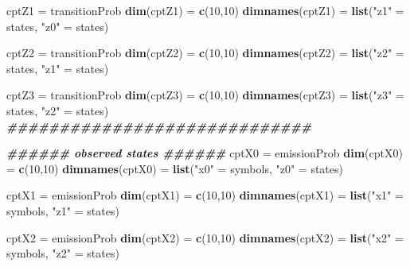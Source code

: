 \documentclass[
]{article}
\newenvironment{Shaded}{\begin{snugshade}}{\end{snugshade}}
\newcommand{\DecValTok}[1]{\textcolor[rgb]{0.00,0.00,0.81}{#1}}
\newcommand{\DocumentationTok}[1]{\textcolor[rgb]{0.56,0.35,0.01}{\textbf{\textit{#1}}}}
\newcommand{\FunctionTok}[1]{\textcolor[rgb]{0.13,0.29,0.53}{\textbf{#1}}}
\newcommand{\NormalTok}[1]{#1}
\newcommand{\OtherTok}[1]{\textcolor[rgb]{0.56,0.35,0.01}{#1}}
\newcommand{\StringTok}[1]{\textcolor[rgb]{0.31,0.60,0.02}{#1}}
\begin{document}
\begin{Shaded}
\begin{Highlighting}[]
\NormalTok{cptZ1 }\OtherTok{=}\NormalTok{ transitionProb}
\FunctionTok{dim}\NormalTok{(cptZ1) }\OtherTok{=} \FunctionTok{c}\NormalTok{(}\DecValTok{10}\NormalTok{,}\DecValTok{10}\NormalTok{)}
\FunctionTok{dimnames}\NormalTok{(cptZ1) }\OtherTok{=} \FunctionTok{list}\NormalTok{(}\StringTok{"z1"} \OtherTok{=}\NormalTok{ states, }\StringTok{"z0"} \OtherTok{=}\NormalTok{ states)}


\NormalTok{cptZ2 }\OtherTok{=}\NormalTok{ transitionProb}
\FunctionTok{dim}\NormalTok{(cptZ2) }\OtherTok{=} \FunctionTok{c}\NormalTok{(}\DecValTok{10}\NormalTok{,}\DecValTok{10}\NormalTok{)}
\FunctionTok{dimnames}\NormalTok{(cptZ2) }\OtherTok{=} \FunctionTok{list}\NormalTok{(}\StringTok{"z2"} \OtherTok{=}\NormalTok{ states, }\StringTok{"z1"} \OtherTok{=}\NormalTok{ states)}

\NormalTok{cptZ3 }\OtherTok{=}\NormalTok{ transitionProb}
\FunctionTok{dim}\NormalTok{(cptZ3) }\OtherTok{=} \FunctionTok{c}\NormalTok{(}\DecValTok{10}\NormalTok{,}\DecValTok{10}\NormalTok{)}
\FunctionTok{dimnames}\NormalTok{(cptZ3) }\OtherTok{=} \FunctionTok{list}\NormalTok{(}\StringTok{"z3"} \OtherTok{=}\NormalTok{ states, }\StringTok{"z2"} \OtherTok{=}\NormalTok{ states)}
\DocumentationTok{\#\#\#\#\#\#\#\#\#\#\#\#\#\#\#\#\#\#\#\#\#\#\#\#\#\#\#\#\#}

\DocumentationTok{\#\#\#\#\#\# observed states \#\#\#\#\#\#}
\NormalTok{cptX0 }\OtherTok{=}\NormalTok{ emissionProb}
\FunctionTok{dim}\NormalTok{(cptX0) }\OtherTok{=} \FunctionTok{c}\NormalTok{(}\DecValTok{10}\NormalTok{,}\DecValTok{10}\NormalTok{)}
\FunctionTok{dimnames}\NormalTok{(cptX0) }\OtherTok{=} \FunctionTok{list}\NormalTok{(}\StringTok{"x0"} \OtherTok{=}\NormalTok{ symbols, }\StringTok{"z0"} \OtherTok{=}\NormalTok{ states)}

\NormalTok{cptX1 }\OtherTok{=}\NormalTok{ emissionProb}
\FunctionTok{dim}\NormalTok{(cptX1) }\OtherTok{=} \FunctionTok{c}\NormalTok{(}\DecValTok{10}\NormalTok{,}\DecValTok{10}\NormalTok{)}
\FunctionTok{dimnames}\NormalTok{(cptX1) }\OtherTok{=} \FunctionTok{list}\NormalTok{(}\StringTok{"x1"} \OtherTok{=}\NormalTok{ symbols, }\StringTok{"z1"} \OtherTok{=}\NormalTok{ states)}

\NormalTok{cptX2 }\OtherTok{=}\NormalTok{ emissionProb}
\FunctionTok{dim}\NormalTok{(cptX2) }\OtherTok{=} \FunctionTok{c}\NormalTok{(}\DecValTok{10}\NormalTok{,}\DecValTok{10}\NormalTok{)}
\FunctionTok{dimnames}\NormalTok{(cptX2) }\OtherTok{=} \FunctionTok{list}\NormalTok{(}\StringTok{"x2"} \OtherTok{=}\NormalTok{ symbols, }\StringTok{"z2"} \OtherTok{=}\NormalTok{ states)}


\end{Highlighting}
\end{Shaded}
\end{document}
